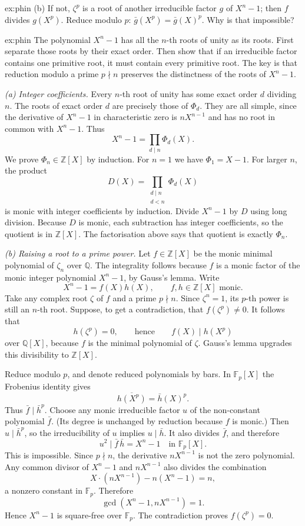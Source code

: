 \begin{hint}{ex:phin}
(b) If not, $\zeta^p$ is a root of another irreducible factor $g$ of $X^n-1$; then $f$ divides $g(X^p)$. Reduce modulo $p$: $\bar g(X^p)=\bar g(X)^p$. Why is that impossible?
\end{hint}

\begin{solution}{ex:phin}
\idea The polynomial $X^n-1$ has all the $n$-th roots of unity as its roots. First separate those roots by their exact order. Then show that if an irreducible factor contains one primitive root, it must contain every primitive root. The key is that reduction modulo a prime $p\nmid n$ preserves the distinctness of the roots of $X^n-1$.

\writeup \emph{(a) Integer coefficients.}
Every $n$-th root of unity has some exact order $d$ dividing $n$. The roots of exact order $d$ are precisely those of $\Phi_d$. They are all simple, since the derivative of $X^n-1$ in characteristic zero is $nX^{n-1}$ and has no root in common with $X^n-1$. Thus
\[
X^n-1=\prod_{d\mid n}\Phi_d(X).
\]
We prove $\Phi_n\in\mathbb Z[X]$ by induction. For $n=1$ we have $\Phi_1=X-1$. For larger $n$, the product
\[
D(X)=\prod_{\substack{d\mid n\\d<n}}\Phi_d(X)
\]
is monic with integer coefficients by induction. Divide $X^n-1$ by $D$ using long division. Because $D$ is monic, each subtraction has integer coefficients, so the quotient is in $\mathbb Z[X]$. The factorisation above says that quotient is exactly $\Phi_n$.

\emph{(b) Raising a root to a prime power.}
Let $f\in\mathbb Z[X]$ be the monic minimal polynomial of $\zeta_n$ over $\mathbb Q$. The integrality follows because $f$ is a monic factor of the monic integer polynomial $X^n-1$, by Gauss's lemma. Write
\[
X^n-1=f(X)h(X),\qquad f,h\in\mathbb Z[X]\text{ monic}.
\]
Take any complex root $\zeta$ of $f$ and a prime $p\nmid n$. Since $\zeta^n=1$, its $p$-th power is still an $n$-th root. Suppose, to get a contradiction, that $f(\zeta^p)\ne0$. It follows that
\[
h(\zeta^p)=0,
\qquad\text{hence}\qquad f(X)\mid h(X^p)
\]
over $\mathbb Q[X]$, because $f$ is the minimal polynomial of $\zeta$. Gauss's lemma upgrades this divisibility to $\mathbb Z[X]$.

Reduce modulo $p$, and denote reduced polynomials by bars. In $\mathbb F_p[X]$ the Frobenius identity gives
\[
\overline{h(X^p)}=\bar h(X)^p.
\]
Thus $\bar f\mid\bar h^p$. Choose any monic irreducible factor $u$ of the non-constant polynomial $\bar f$. (Its degree is unchanged by reduction because $f$ is monic.) Then $u\mid\bar h^p$, so the irreducibility of $u$ implies $u\mid\bar h$. It also divides $\bar f$, and therefore
\[
u^2\mid\bar f\,\bar h=X^n-1\quad\text{in }\mathbb F_p[X].
\]
This is impossible. Since $p\nmid n$, the derivative $nX^{n-1}$ is not the zero polynomial. Any common divisor of $X^n-1$ and $nX^{n-1}$ also divides the combination
\[
X\cdot(nX^{n-1})-n(X^n-1)=n,
\]
a nonzero constant in $\mathbb F_p$. Therefore
\[
\gcd(X^n-1,nX^{n-1})=1.
\]
Hence $X^n-1$ is square-free over $\mathbb F_p$. The contradiction proves $f(\zeta^p)=0$.


\end{solution}
